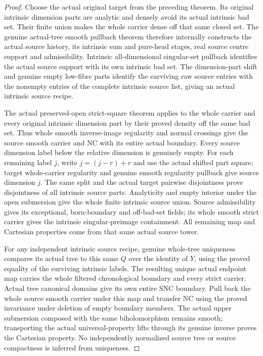 \begin{proof}
Choose the actual original target from the preceding theorem. Its
original intrinsic dimension parts are analytic and densely avoid its
actual intrinsic bad set. Their finite union makes the whole carrier
dense off that same closed set. The genuine actual-tree smooth
pullback theorem therefore internally constructs the actual source
history, its intrinsic sum and pure-head stages, real source centre
support and admissibility. Intrinsic all-dimensional singular-set
pullback identifies the actual source support with its own intrinsic
bad set. The dimension-part shift and genuine empty low-fibre parts
identify the surviving raw source entries with the nonempty entries
of the complete intrinsic source list, giving an actual intrinsic
source recipe.

The actual preserved-open strict-square theorem applies to the whole
carrier and every original intrinsic dimension part by their proved
density off the same bad set. Thus whole smooth inverse-image
regularity and normal crossings give the source smooth carrier and
NC with its entire actual boundary. Every source dimension label below
the relative dimension is genuinely empty. For each remaining label
$j$, write $j=(j-r)+r$ and use the actual shifted part square; target
whole-carrier regularity and genuine smooth regularity pullback give
source dimension $j$. The same split and the actual target pairwise
disjointness prove disjointness of all intrinsic source parts.
Analyticity and empty interior under the open submersion give the
whole finite intrinsic source union. Source admissibility gives its
exceptional, born-boundary and off-bad-set fields; its whole smooth
strict carrier gives the intrinsic singular-preimage containment.
All remaining map and Cartesian properties come from that same actual
source tower.

For any independent intrinsic source recipe, genuine whole-tree
uniqueness compares its actual tree to this same $Q$ over the identity
of $Y$, using the proved equality of the surviving intrinsic labels.
The resulting unique actual endpoint map carries the whole filtered
chronological boundary and every strict carrier. Actual tree
canonical domains give its own entire SNC boundary. Pull back the
whole source smooth carrier under this map and transfer NC using the
proved invariance under deletion of empty boundary members. The actual
upper submersion composed with the same biholomorphism remains smooth;
transporting the actual universal-property lifts through its genuine
inverse proves the Cartesian property. No independently normalized
source tree or source compactness is inferred from uniqueness.
\end{proof}

